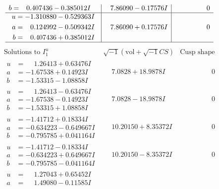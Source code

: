 \documentclass[1p]{elsarticle_modified}
\theoremstyle{definition}
\newcommand{\I}{\sqrt{-1}}
\begin{document}
$$\begin{array}{c|c|c}
\begin{aligned}
b &= \phantom{-}0.407436 - 0.385012 I\end{aligned}
 & \phantom{-}7.86090 - 0.17576 I & \phantom{-0.000000 } 0 \\ \hline\begin{aligned}
u &= -1.310880 - 0.529363 I \\
a &= \phantom{-}0.124992 - 0.509342 I \\
b &= \phantom{-}0.407436 + 0.385012 I\end{aligned}
 & \phantom{-}7.86090 + 0.17576 I & \phantom{-0.000000 } 0\\
 \hline 
 \end{array}$$\newpage$$\begin{array}{c|c|c}  
\text{Solutions to }I^u_{1}& \I (\text{vol} + \sqrt{-1}CS) & \text{Cusp shape}\\
 \hline 
\begin{aligned}
u &= \phantom{-}1.26413 + 0.63476 I \\
a &= -1.67538 + 0.14923 I \\
b &= -1.53315 - 1.08858 I\end{aligned}
 & \phantom{-}7.0828 + 18.9878 I & \phantom{-0.000000 } 0 \\ \hline\begin{aligned}
u &= \phantom{-}1.26413 - 0.63476 I \\
a &= -1.67538 - 0.14923 I \\
b &= -1.53315 + 1.08858 I\end{aligned}
 & \phantom{-}7.0828 - 18.9878 I & \phantom{-0.000000 } 0 \\ \hline\begin{aligned}
u &= -1.41712 + 0.18334 I \\
a &= -0.634223 - 0.649667 I \\
b &= -0.795785 + 0.041164 I\end{aligned}
 & \phantom{-}10.20150 + 8.35372 I & \phantom{-0.000000 } 0 \\ \hline\begin{aligned}
u &= -1.41712 - 0.18334 I \\
a &= -0.634223 + 0.649667 I \\
b &= -0.795785 - 0.041164 I\end{aligned}
 & \phantom{-}10.20150 - 8.35372 I & \phantom{-0.000000 } 0 \\ \hline\begin{aligned}
u &= \phantom{-}1.27043 + 0.65452 I \\
a &= \phantom{-}1.49080 - 0.11585 I \\

\end{aligned}
\end{array}$$
\end{document}
